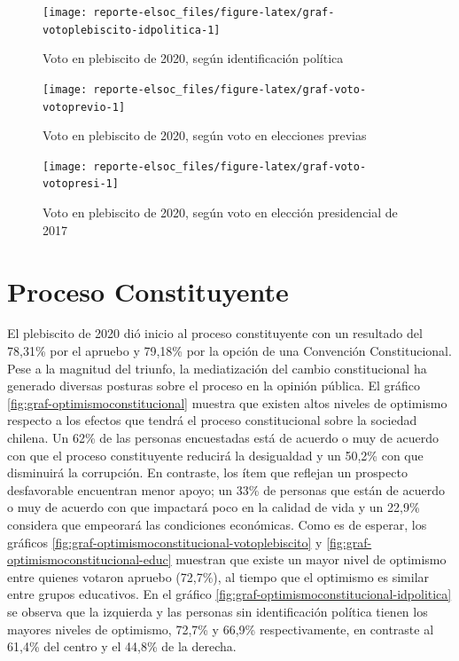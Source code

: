 \documentclass[
  12pt,
]{book}
\begin{document}
\begin{figure}

{\centering \texttt{[image: reporte-elsoc\_files/figure-latex/graf-votoplebiscito-idpolitica-1]} 

}

\caption{Voto en plebiscito de 2020, según identificación política}\label{fig:graf-votoplebiscito-idpolitica}
\end{figure}

\begin{figure}

{\centering \texttt{[image: reporte-elsoc\_files/figure-latex/graf-voto-votoprevio-1]} 

}

\caption{Voto en plebiscito de 2020, según voto en elecciones previas}\label{fig:graf-voto-votoprevio}
\end{figure}

\begin{figure}

{\centering \texttt{[image: reporte-elsoc\_files/figure-latex/graf-voto-votopresi-1]} 

}

\caption{Voto en plebiscito de 2020, según voto en elección presidencial de 2017}\label{fig:graf-voto-votopresi}
\end{figure}

\hypertarget{proceso-constituyente}{%
\section{Proceso Constituyente}\label{proceso-constituyente}}

El plebiscito de 2020 dió inicio al proceso constituyente con un resultado del 78,31\% por el apruebo y 79,18\% por la opción de una Convención Constitucional. Pese a la magnitud del triunfo, la mediatización del cambio constitucional ha generado diversas posturas sobre el proceso en la opinión pública. El gráfico \ref{fig:graf-optimismoconstitucional} muestra que existen altos niveles de optimismo respecto a los efectos que tendrá el proceso constitucional sobre la sociedad chilena. Un 62\% de las personas encuestadas está de acuerdo o muy de acuerdo con que el proceso constituyente reducirá la desigualdad y un 50,2\% con que disminuirá la corrupción. En contraste, los ítem que reflejan un prospecto desfavorable encuentran menor apoyo; un 33\% de personas que están de acuerdo o muy de acuerdo con que impactará poco en la calidad de vida y un 22,9\% considera que empeorará las condiciones económicas. Como es de esperar, los gráficos \ref{fig:graf-optimismoconstitucional-votoplebiscito} y \ref{fig:graf-optimismoconstitucional-educ} muestran que existe un mayor nivel de optimismo entre quienes votaron apruebo (72,7\%), al tiempo que el optimismo es similar entre grupos educativos. En el gráfico \ref{fig:graf-optimismoconstitucional-idpolitica} se observa que la izquierda y las personas sin identificación política tienen los mayores niveles de optimismo, 72,7\% y 66,9\% respectivamente, en contraste al 61,4\% del centro y el 44,8\% de la derecha.
\end{document}
